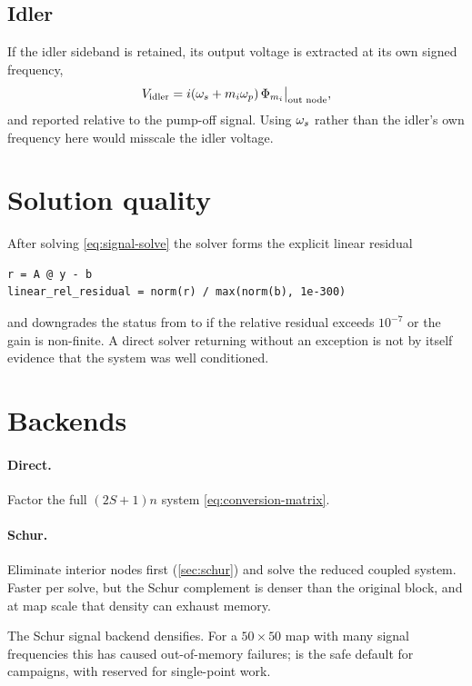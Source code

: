 \subsection{Idler}

If the idler sideband is retained, its output voltage is extracted at its own
signed frequency,
\begin{equation}
  V_{\mathrm{idler}} = i(\omega_{s} + m_i\omega_{p})\,\Phi_{m_i}\big|_{\text{out node}},
\end{equation}
and reported relative to the pump-off signal. Using $\omega_{s}$ rather than the idler's
own frequency here would misscale the idler voltage.

\section{Solution quality}

\begin{implnote}
After solving \eqref{eq:signal-solve} the solver forms the explicit linear
residual
\begin{lstlisting}
r = A @ y - b
linear_rel_residual = norm(r) / max(norm(b), 1e-300)
\end{lstlisting}
and downgrades the status from  to  if the
relative residual exceeds $10^{-7}$ or the gain is non-finite. A direct solver
returning without an exception is not by itself evidence that the system was
well conditioned.
\end{implnote}

\section{Backends}

\paragraph{Direct.} Factor the full $(2S+1)n$ system \eqref{eq:conversion-matrix}.

\paragraph{Schur.} Eliminate interior nodes first (\cref{sec:schur}) and solve
the reduced coupled system. Faster per solve, but the Schur complement is denser
than the original block, and at map scale that density can exhaust memory.

\begin{caveat}
The Schur signal backend densifies. For a $50\times50$ map with many signal
frequencies this has caused out-of-memory failures;  is the safe
default for campaigns, with  reserved for single-point work.
\end{caveat}

